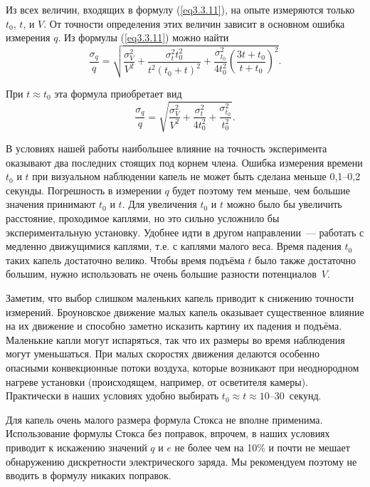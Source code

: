 Из всех величин, входящих в формулу (\ref{eq3.3.11}), на опыте измеряются только $t_0$, $t$, и $V$. От точности определения этих величин зависит в основном ошибка измерения $q$. Из формулы (\ref{eq3.3.11}) можно найти
\begin{equation}
\frac{\sigma_q}{q}=\sqrt{\frac{\sigma^2_V}{V^2}+\frac{\sigma^2_t t_0^2}{t^2(t_0+t)^2}+
\frac{\sigma^2_{t_0}}{4t^2_0}\left(\frac{3t+t_0} {t+t_0}\right)^2}.
\label{eq3.3.12}
\end{equation}

При $t\approx t_0$ эта формула приобретает вид
\begin{equation}
\frac{\sigma_q}{q}=\sqrt{\frac{\sigma^2_V}{V^2}+ \frac{\sigma^2_t}{4t^2_0}+ \frac{\sigma^2_{t_0}}{t^2_0}}.
\label{eq3.3.13}
\end{equation}

В условиях нашей работы наибольшее влияние на точность эксперимента оказывают два последних стоящих под корнем члена. Ошибка измерения времени $t_0$ и $t$ при визуальном наблюдении капель не может быть сделана меньше 0,1--0,2 секунды. Погрешность в измерении $q$ будет поэтому тем меньше, чем большие значения принимают $t_0$ и $t$. Для увеличения $t_0$ и $t$ можно было бы увеличить расстояние, проходимое каплями, но это сильно усложнило бы экспериментальную установку.
Удобнее идти в другом направлении~--- работать с медленно движущимися каплями, т.е. с каплями малого веса. Время падения $t_0$ таких капель достаточно велико. Чтобы время подъёма $t$ было также достаточно большим, нужно использовать не очень большие разности потенциалов~$V$.

Заметим, что выбор слишком маленьких капель приводит к снижению точности измерений. Броуновское движение малых капель оказывает существенное влияние на их движение и способно заметно исказить картину их падения и подъёма. Маленькие капли могут испаряться, так что их размеры во время наблюдения могут уменьшаться. При малых скоростях движения делаются особенно опасными конвекционные потоки воздуха, которые возникают при неоднородном нагреве установки (происходящем, например, от осветителя камеры). Практически в наших условиях удобно выбирать $t_0\approx t\approx 10$--30~секунд.

Для капель очень малого размера формула Стокса не вполне применима. Использование формулы Стокса без поправок, впрочем, в наших условиях приводит к искажению значений $q$ и $e$ не более чем на 10\% и почти не мешает обнаружению дискретности электрического заряда. Мы рекомендуем поэтому не вводить в формулу никаких поправок.


